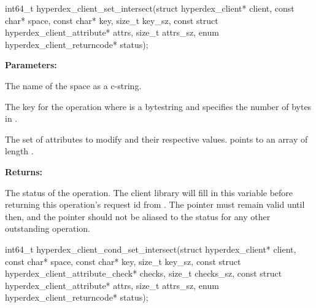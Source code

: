 \funcsep
{}
\begin{ccode}
int64_t hyperdex_client_set_intersect(struct hyperdex_client* client,
                const char* space,
                const char* key, size_t key_sz,
                const struct hyperdex_client_attribute* attrs, size_t attrs_sz,
                enum hyperdex_client_returncode* status);
\end{ccode}
\funcdesc 

\noindent\textbf{Parameters:}
\begin{description}[labelindent=\widthof{{\code{attrs}, \code{attrs\_sz}}},leftmargin=*,noitemsep,nolistsep,align=right]
\item[\code{space}] The name of the space as a c-string.
\item[\code{key}, \code{key\_sz}] The key for the operation where  is a bytestring and  specifies the number of bytes in .
\item[\code{attrs}, \code{attrs\_sz}] The set of attributes to modify and their respective values.   points to an array of length .
\end{description}

\noindent\textbf{Returns:}
\begin{description}[labelindent=\widthof{{\code{status}}},leftmargin=*,noitemsep,nolistsep,align=right]
\item[\code{status}] The status of the operation.  The client library will fill in this variable before returning this operation's request id from .  The pointer must remain valid until then, and the pointer should not be aliased to the status for any other outstanding operation.
\end{description}

\funcsep
{}
\begin{ccode}
int64_t hyperdex_client_cond_set_intersect(struct hyperdex_client* client,
                const char* space,
                const char* key, size_t key_sz,
                const struct hyperdex_client_attribute_check* checks, size_t checks_sz,
                const struct hyperdex_client_attribute* attrs, size_t attrs_sz,
                enum hyperdex_client_returncode* status);
\end{ccode}
\funcdesc 

